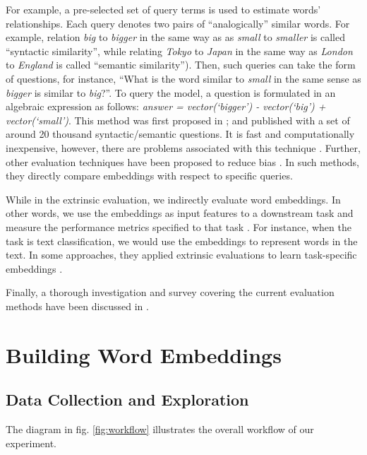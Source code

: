 \documentclass[11pt,letterpaper]{article}
\begin{document}
For example, a pre-selected set of query terms is used to estimate
words' relationships. Each query denotes two pairs of ``analogically''
similar words. For example, relation \emph{big} to \emph{bigger} in the
same way as as \emph{small} to \emph{smaller} is called ``syntactic
similarity'', while relating \emph{Tokyo} to \emph{Japan} in the same
way as \emph{London} to \emph{England} is called ``semantic
similarity''). Then, such queries can take the form of questions, for
instance, ``What is the word similar to \emph{small} in the same sense
as \emph{bigger} is similar to \emph{big}?''. To query the model, a
question is formulated in an algebraic expression as follows:
\emph{answer = vector(`bigger') - vector(`big') + vector(`small')}. This
method was first proposed in \citep{Mikolov:2013wc}; and published with
a set of around 20 thousand syntactic/semantic questions. It is fast and
computationally inexpensive, however, there are problems associated with
this technique \citep{faruqui2016problems}. Further, other evaluation
techniques have been proposed to reduce bias
\citep{schnabel2015evaluation}. In such methods, they directly compare
embeddings with respect to specific queries.

While in the extrinsic evaluation, we indirectly evaluate word
embeddings. In other words, we use the embeddings as input features to a
downstream task and measure the performance metrics specified to that
task \citep{schnabel2015evaluation}. For instance, when the task is text
classification, we would use the embeddings to represent words in the
text. In some approaches, they applied extrinsic evaluations to learn
task-specific embeddings \citep{tang2014learning}.

Finally, a thorough investigation and survey covering the current
evaluation methods have been discussed in \citep{bakarov2018survey}.

\section{Building Word Embeddings}\label{building-word-embeddings}

\subsection{Data Collection and
Exploration}\label{data-collection-and-exploration}

The diagram in fig. \ref{fig:workflow} illustrates the overall workflow
of our experiment.
\end{document}
